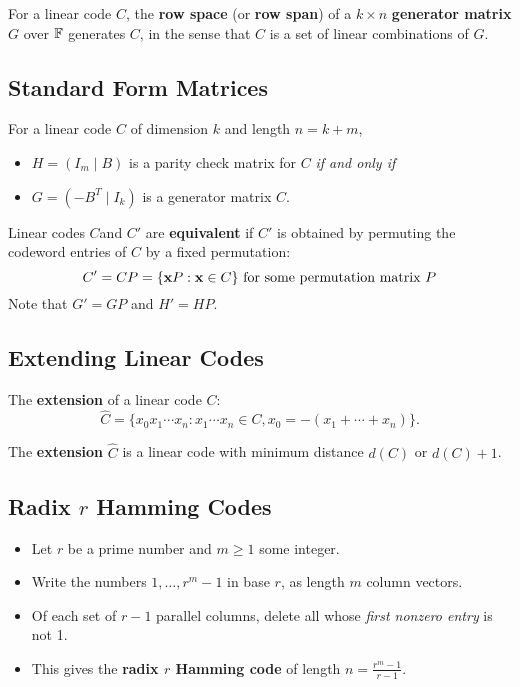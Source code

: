 For a linear code \(C\), the \textbf{row space} (or \textbf{row span}) of a \(k \times n\) \textbf{generator matrix} \(G\) over \(\mathbb{F}\) generates \(C\), in the sense that \(C\) is a set of linear combinations of \(G\).

\subsection{Standard Form Matrices}
For a linear code \(C\) of dimension \(k\) and length \(n = k + m\),
\begin{itemize}
    \item \(H = (I_m \mid B)\) is a parity check matrix for \(C\) \textit{if and only if}
    \item \(G = (-B^T \mid I_k)\) is a generator matrix \(C\).
\end{itemize}

Linear codes \(C\)and \(C'\) are \textbf{equivalent} if \(C'\) is obtained by permuting the codeword entries of \(C\) by a fixed permutation:
\[C' = CP = \{ \mathbf{x} P : \mathbf{x} \in C \} \text{ for some permutation matrix } P\]
Note that \(G' = GP\) and \(H' = HP\).

\subsection{Extending Linear Codes}
The \textbf{extension} of a linear code \(C\):
\[\hat{C} = \{ x_0x_1 \cdots x_n : x_1 \cdots x_n \in C, x_0 = -(x_1 + \cdots + x_n) \}.\]

The \textbf{extension} \(\hat{C}\) is a linear code with minimum distance \(d(C)\) or \(d(C) + 1\).

\subsection{Radix \(r\) Hamming Codes}
\begin{itemize}
    \item Let \(r\) be a prime number and \(m \geq 1\) some integer.
    \item Write the numbers \(1, \dots, r^m - 1\) in base \(r\), as length \(m\) column vectors.
    \item Of each set of \(r - 1\) parallel columns, delete all whose \textit{first nonzero entry} is not 1.
    \item This gives the \textbf{radix \(r\) Hamming code} of length \(n = \frac{r^m - 1}{r - 1}\).
\end{itemize}

\newpage